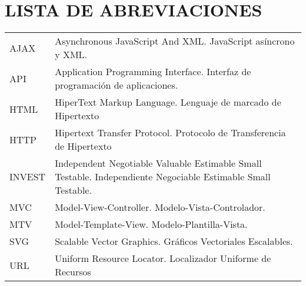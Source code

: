 \chapter*{LISTA DE ABREVIACIONES}

\begin{tabular}{l p{12cm}}
    AJAX \hspace{1cm}   & Asynchronous JavaScript And XML. JavaScript asíncrono y XML.\\
    API \hspace{1cm}   & Application Programming Interface. Interfaz de programación de aplicaciones.\\
    HTML \hspace{1cm}   & HiperText Markup Language. Lenguaje de marcado de Hipertexto \\
    HTTP \hspace{1cm}   & Hipertext Transfer Protocol. Protocolo de 
                               Transferencia de Hipertexto            \\
    INVEST \hspace{1cm} &  Independent Negotiable Valuable Estimable Small Testable. Independiente Negociable Estimable Small Testable. \\
    MVC \hspace{1cm}    & Model-View-Controller. Modelo-Vista-Controlador.\\
    MTV \hspace{1cm}    & Model-Template-View. Modelo-Plantilla-Vista. \\
    SVG	\hspace{1cm}    & Scalable Vector Graphics. Gráficos Vectoriales Escalables.\\
    URL	 \hspace{1cm}   & Uniform Resource Locator. Localizador Uniforme de Recursos \\

\end{tabular}
\clearpage

